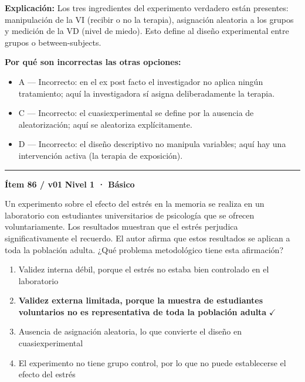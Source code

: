 \documentclass[12pt,a4paper]{article}
\begin{document}
\noindent\textbf{\color{azul}Explicación:} Los tres ingredientes del experimento verdadero están presentes: manipulación de la VI (recibir o no la terapia), asignación aleatoria a los grupos y medición de la VD (nivel de miedo). Esto define al diseño experimental entre grupos o between-subjects.

\noindent\textbf{\color{gris}Por qué son incorrectas las otras opciones:}
\begin{itemize}
  \item {\small A — Incorrecto: en el ex post facto el investigador no aplica ningún tratamiento; aquí la investigadora sí asigna deliberadamente la terapia.}
  \item {\small C — Incorrecto: el cuasiexperimental se define por la ausencia de aleatorización; aquí se aleatoriza explícitamente.}
  \item {\small D — Incorrecto: el diseño descriptivo no manipula variables; aquí hay una intervención activa (la terapia de exposición).}
\end{itemize}
\vspace{8pt}\hrule\vspace{10pt}

\begin{mdframed}[backgroundcolor=fondogris,linecolor=azul,linewidth=1pt,innerleftmargin=10pt,innerrightmargin=10pt,innertopmargin=7pt,innerbottommargin=7pt]
\textbf{Ítem 86 / v01} \hfill {\small\bfseries\color{azul} Nivel 1 · Básico}
\end{mdframed}

Un experimento sobre el efecto del estrés en la memoria se realiza en un laboratorio con estudiantes universitarios de psicología que se ofrecen voluntariamente. Los resultados muestran que el estrés perjudica significativamente el recuerdo. El autor afirma que estos resultados se aplican a toda la población adulta. ¿Qué problema metodológico tiene esta afirmación?

\begin{enumerate}
  \item[A.] Validez interna débil, porque el estrés no estaba bien controlado en el laboratorio
  \item[\textbf{\color{verde}B.}] \textbf{\color{verde} Validez externa limitada, porque la muestra de estudiantes voluntarios no es representativa de toda la población adulta} \hfill $\checkmark$
  \item[C.] Ausencia de asignación aleatoria, lo que convierte el diseño en cuasiexperimental
  \item[D.] El experimento no tiene grupo control, por lo que no puede establecerse el efecto del estrés
\end{enumerate}
\end{document}
